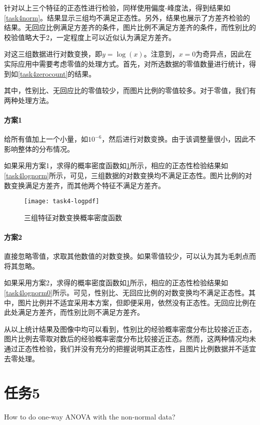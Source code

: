 \documentclass[a4paper,12pt]{article}
\begin{document}
    针对以上三个特征的正态性进行检验，同样使用偏度-峰度法，得到结果如\cref{task4norm}。结果显示三组均不满足正态性。另外，结果也展示了方差齐检验的结果。无回应比例满足方差齐的条件，图片比例不满足方差齐的条件，而性别比的校验值略大于2，一定程度上可以近似认为满足方差齐。
    

    对这三组数据进行对数变换，即$y=\log(x)$。注意到，$x=0$为奇异点，因此在实际应用中需要考虑零值的处理方式。首先，对所选数据的零值数量进行统计，得到如\cref{task4zerocount}的结果。
    
    其中，性别比、无回应比的零值较少，而图片比例的零值较多。对于零值，我们有两种处理方法。
    \paragraph{方案1} 给所有值加上一个小量，如$10^{-6}$，然后进行对数变换。由于该调整量很小，因此不影响整体的分布情况。

    如果采用方案1，求得的概率密度函数如\cref{fig:task4loggnn}所示，相应的正态性检验结果如\cref{task4lognorm}所示，可见，三组数据的对数变换均不满足正态性。图片比例的对数变换满足方差齐，而其他两个特征不满足方差齐。

    \begin{figure}
      \texttt{[image: task4-logpdf]}
      \caption{三组特征对数变换概率密度函数}
      \label{fig:task4loggnn}
    \end{figure}

    
    \paragraph{方案2} 直接忽略零值，求取其他数值的对数变换。如果零值较少，可以认为其为毛刺点而将其忽略。

    如果采用方案2，求得的概率密度函数如\cref{fig:task4loggnn}所示，相应的正态性检验结果如\cref{task4lognorm0}所示。可见，性别比、无回应比例的对数变换均不满足正态性。其中，图片比例并不适宜采用本方案，但即便采用，依然没有正态性。无回应比例在此处满足方差齐，而性别比则不满足方差齐。

    

    从以上统计结果及图像中均可以看到，性别比的经验概率密度分布比较接近正态，图片比例去零取对数后的经验概率密度分布比较接近正态。然而，这两种情况均未通过正态性检验，我们并没有充分的把握说明其正态性，且图片比例数据并不适宜去零处理。
    \section{任务5} %
    How to do one-way ANOVA with the non-normal data?
\end{document}
